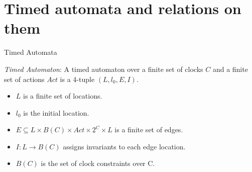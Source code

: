 \documentclass{beamer}
\begin{document}
\section{Timed automata and relations on them}

\begin{frame}{Timed Automata}
  \begin{definition}
    \emph{Timed Automaton}: A timed automaton
    \cite{Alur94atheory} over a finite set of clocks $C$
    and a finite set of actions $Act$ is a 4-tuple $(L, l_{0}, E, I)$.
    \begin{itemize}
    \item $L$ is a finite set of locations.
    \item $l_{0}$ is the initial location.
    \item $E \subseteq L \times B(C) \times Act \times 2^{C} \times L$
      is a finite set of edges.
    \item $I: L \rightarrow B(C)$ assigns invariants to each edge
      location.
    \item $B(C)$ is the set of clock constraints over C.
    \end{itemize}
  \end{definition}
\end{frame}
\end{document}
